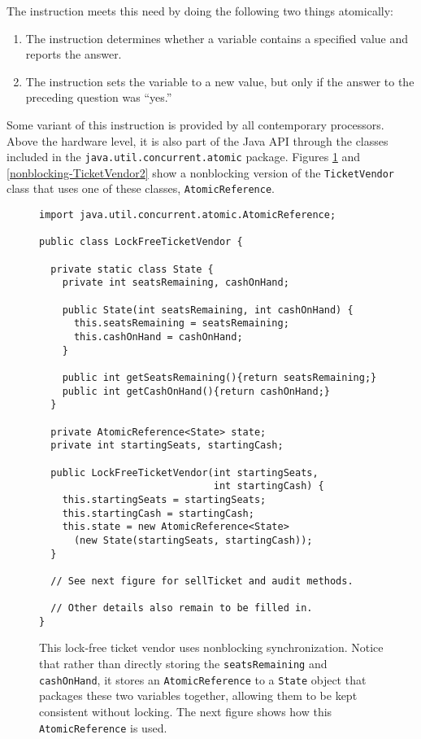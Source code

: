 The  instruction meets this need by doing the following two things atomically:
\begin{enumerate}
\item The instruction determines whether a variable contains a specified value and reports the answer.
\item The instruction sets the variable to a new value, but only if the answer to the preceding question was ``yes.''
\end{enumerate}
Some variant of this instruction is provided by all contemporary processors.  Above the hardware
level, it is also part of the Java API through the classes included in the \texttt{java.util.concurrent.atomic} package.
Figures \ref{nonblocking-TicketVendor1} and \ref{nonblocking-TicketVendor2} show a nonblocking version of the \texttt{TicketVendor} class that uses one
of these classes, \texttt{AtomicReference}.
\begin{figure}
\begin{verbatim}
import java.util.concurrent.atomic.AtomicReference;

public class LockFreeTicketVendor { 
    
  private static class State {
    private int seatsRemaining, cashOnHand;
    
    public State(int seatsRemaining, int cashOnHand) {
      this.seatsRemaining = seatsRemaining;
      this.cashOnHand = cashOnHand;
    }

    public int getSeatsRemaining(){return seatsRemaining;}
    public int getCashOnHand(){return cashOnHand;}
  }

  private AtomicReference<State> state;
  private int startingSeats, startingCash;

  public LockFreeTicketVendor(int startingSeats,
                              int startingCash) {
    this.startingSeats = startingSeats;
    this.startingCash = startingCash;
    this.state = new AtomicReference<State>
      (new State(startingSeats, startingCash));
  }

  // See next figure for sellTicket and audit methods.

  // Other details also remain to be filled in.
}
\end{verbatim}
\caption{This lock-free ticket vendor uses nonblocking synchronization.
Notice that rather than directly storing the \texttt{seatsRemaining}
and \texttt{cashOnHand}, it stores an \texttt{AtomicReference} to a
\texttt{State} object that packages these two variables together,
allowing them to be kept consistent without locking.
The next figure shows how this \texttt{AtomicReference} is used.}\label{nonblocking-TicketVendor1}
\end{figure}
